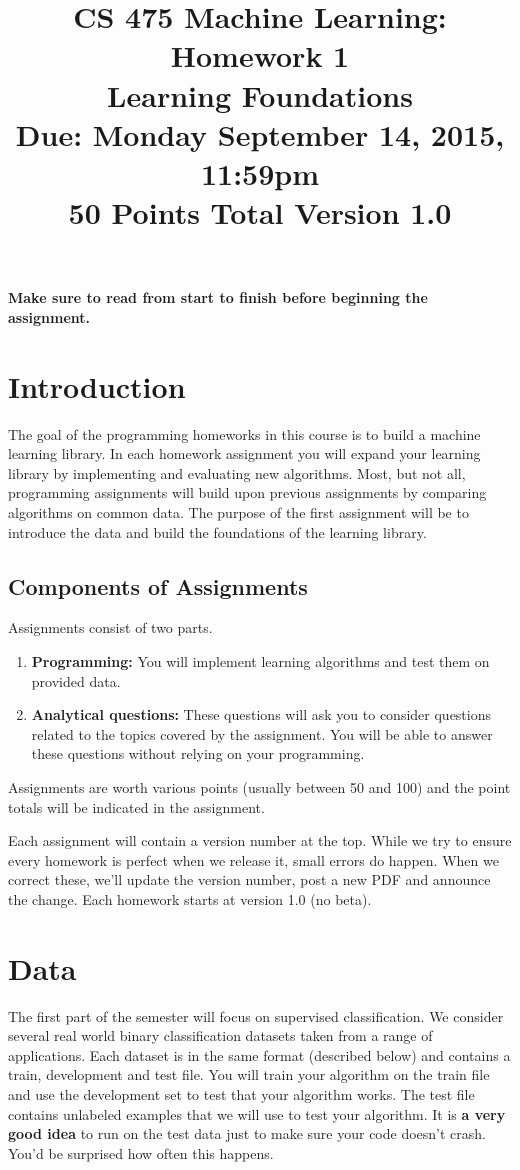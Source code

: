 \documentclass[11pt]{article}
\title{CS 475 Machine Learning: Homework 1\\Learning Foundations\\
\Large{Due: Monday September 14, 2015, 11:59pm}\\
50 Points Total \hspace{1cm} Version 1.0}
\author{}
\date{}
\begin{document}
\large
\maketitle
\thispagestyle{headings}

\vspace{-.5in}

{\bf Make sure to read from start to finish before beginning the assignment.}
\section{Introduction}
The goal of the programming homeworks in this course is to build a machine learning library. In each homework assignment you will expand your learning library by implementing and evaluating new algorithms. Most, but not all, programming assignments will build upon previous assignments by comparing algorithms on common data. The purpose of the first assignment will be to introduce the data and build the foundations of the learning library. 

\subsection{Components of Assignments}
Assignments consist of two parts.
\begin{enumerate}
\item {\bf Programming:} You will implement learning algorithms and test them on provided data.
\item {\bf Analytical questions:} These questions will ask you to consider questions related to the topics covered by the assignment. You will be able to answer these questions without relying on your programming.
\end{enumerate}

Assignments are worth various points (usually between 50 and 100) and the point totals will be indicated in the assignment.

Each assignment will contain a version number at the top. While we try to ensure every homework is perfect when we release it, small errors do happen. When we correct these, we'll update the version number, post a new PDF and announce the change. Each homework starts at version 1.0 (no beta).

\section{Data}
The first part of the semester will focus on supervised classification. We consider several real world binary classification datasets taken from a range of applications. Each dataset is in the same format (described below) and contains a train, development and test file. You will train your algorithm on the train file and use the development set to test that your algorithm works. The test file contains unlabeled examples that we will use to test your algorithm. It is {\bf a very good idea} to run on the test data just to make sure your code doesn't crash. You'd be surprised how often this happens.
\end{document}

